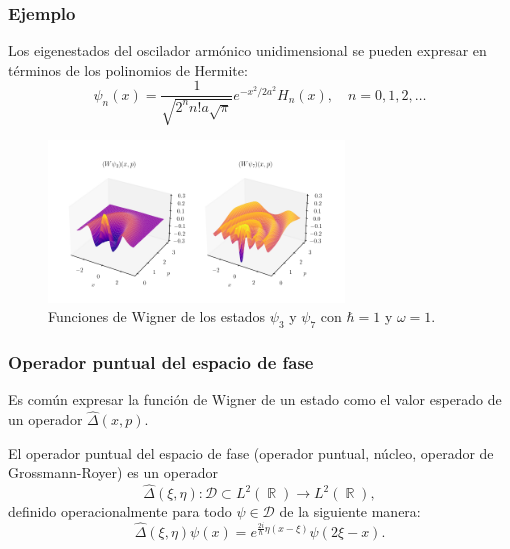\documentclass[10pt]{beamer}
\DeclareMathOperator{\R}{\mathbb{R}}
\begin{document}
  \begin{frame}
    \frametitle{Ejemplo}

    Los eigenestados del oscilador armónico unidimensional
    se pueden expresar en términos de los polinomios de
    Hermite:
    \begin{equation}
      \psi_n(x) = \frac{1}{\sqrt{2^{n} n! a \sqrt{\pi}}}
      e^{-x^2 / 2a^2} H_n(x),
      \quad n = 0,1,2,\ldots
    \end{equation}

    \begin{figure}[h]
      \centering
      \includegraphics[width=0.7\textwidth]{
      imgs/harmonic_osc_wigner.png}
      \caption{
      Funciones de Wigner de los estados $\psi_3$ y $\psi_7$ 
      con $\hbar = 1$ y $\omega = 1$.}
      \label{fig:harmonic_osc_wigner}
    \end{figure}
  \end{frame}

  \begin{frame}
    \frametitle{Operador puntual del espacio de fase}

    Es común expresar la función de Wigner de un estado como
    el valor esperado de un operador $\hat
    \Delta(x,p)$. 

    \vspace{10pt}

    \begin{definition}
      El operador puntual del espacio de fase
      (operador puntual, núcleo, operador de
      Grossmann-Royer) es un operador
      \begin{equation}
        \hat \Delta(\xi,\eta)
        : \mathcal D \subset L^2(\R) \to L^2(\R),
      \end{equation}
      definido operacionalmente para todo $\psi \in \mathcal
      D$ de la siguiente manera:
      \begin{equation}
        \hat \Delta(\xi,\eta) \psi(x)
        = e^{\frac{2i}{\hbar} \eta(x - \xi)} \psi(2\xi - x).
      \end{equation}
    \end{definition}
  \end{frame}
\end{document}
